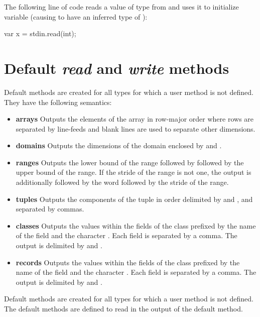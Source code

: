 \begin{example}
The following line of code reads a value of type  from
 and uses it to initialize variable  (causing
 to have an inferred type of ):
\begin{chapel}
var x = stdin.read(int);
\end{chapel}
\end{example}


\section{Default {\em read} and {\em write} methods}

Default  methods are created for all types for which a user
 method is not defined.  They have the following semantics:
\begin{itemize}
\item
{\bf arrays} Outputs the elements of the array in row-major order
where rows are separated by line-feeds and blank lines are used to
separate other dimensions.
\item
{\bf domains} Outputs the dimensions of the domain enclosed
by \chpl{[} and \chpl{]}.
\item
{\bf ranges} Outputs the lower bound of the range followed
by  followed by the upper bound of the range.  If the stride
of the range is not one, the output is additionally followed by the
word  followed by the stride of the range.
\item
{\bf tuples} Outputs the components of the tuple in order delimited
by \chpl{(} and \chpl{)}, and separated by commas.
\item
{\bf classes} Outputs the values within the fields of the class
prefixed by the name of the field and the character \chpl{=}.  Each
field is separated by a comma.  The output is delimited by \chpl{\{}
and \chpl{\}}.
\item
{\bf records} Outputs the values within the fields of the class
prefixed by the name of the field and the character \chpl{=}.  Each
field is separated by a comma.  The output is delimited by \chpl{(}
and \chpl{)}.
\end{itemize}

Default  methods are created for all types for which a user
 method is not defined.  The default  methods are
defined to read in the output of the default  method.
